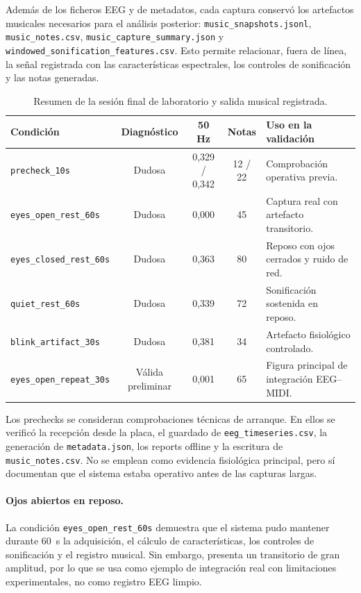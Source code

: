 \documentclass[../main.tex]{subfiles}
\begin{document}
Además de los ficheros EEG y de metadatos, cada captura conservó los artefactos musicales necesarios para el análisis posterior: \texttt{music\_snapshots.jsonl}, \texttt{music\_notes.csv}, \texttt{music\_capture\_summary.json} y \texttt{windowed\_sonification\_features.csv}. Esto permite relacionar, fuera de línea, la señal registrada con las características espectrales, los controles de sonificación y las notas generadas.

\begin{table}[htbp]
    \centering
    \small
    \caption{Resumen de la sesión final de laboratorio y salida musical registrada.}
    \label{tab:validacion_sesion_final_musica}
    \begin{tabular}{p{} c c c p{}}
        \hline
        \textbf{Condición} & \textbf{Diagnóstico} & \textbf{50 Hz} & \textbf{Notas} & \textbf{Uso en la validación} \\
        \hline
        \texttt{precheck\_10s} & Dudosa & 0,329 / 0,342 & 12 / 22 & Comprobación operativa previa. \\
        \texttt{eyes\_open\_rest\_60s} & Dudosa & 0,000 & 45 & Captura real con artefacto transitorio. \\
        \texttt{eyes\_closed\_rest\_60s} & Dudosa & 0,363 & 80 & Reposo con ojos cerrados y ruido de red. \\
        \texttt{quiet\_rest\_60s} & Dudosa & 0,339 & 72 & Sonificación sostenida en reposo. \\
        \texttt{blink\_artifact\_30s} & Dudosa & 0,381 & 34 & Artefacto fisiológico controlado. \\
        \texttt{eyes\_open\_repeat\_30s} & Válida preliminar & 0,001 & 65 & Figura principal de integración EEG--MIDI. \\
        \hline
    \end{tabular}
\end{table}

Los prechecks se consideran comprobaciones técnicas de arranque. En ellos se verificó la recepción desde la placa, el guardado de \texttt{eeg\_timeseries.csv}, la generación de \texttt{metadata.json}, los reports offline y la escritura de \texttt{music\_notes.csv}. No se emplean como evidencia fisiológica principal, pero sí documentan que el sistema estaba operativo antes de las capturas largas.

\paragraph{Ojos abiertos en reposo.}
La condición \texttt{eyes\_open\_rest\_60s} demuestra que el sistema pudo mantener durante \SI{60}{\second} la adquisición, el cálculo de características, los controles de sonificación y el registro musical. Sin embargo, presenta un transitorio de gran amplitud, por lo que se usa como ejemplo de integración real con limitaciones experimentales, no como registro EEG limpio.
\end{document}
